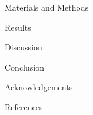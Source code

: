 \documentclass[10pt]{beamer}
\theoremstyle{remark}
\theoremstyle{definition}
\begin{document}
\begin{frame}{Materials and Methods}
\end{frame}

\begin{frame}{Results}
\end{frame}

\begin{frame}{Discussion}
\end{frame}

\begin{frame}{Conclusion}
\end{frame}

\begin{frame}{Acknowledgements}
\end{frame}

\begin{frame}[allowframebreaks]{References}
\printbibliography
\end{frame}
\end{document}
